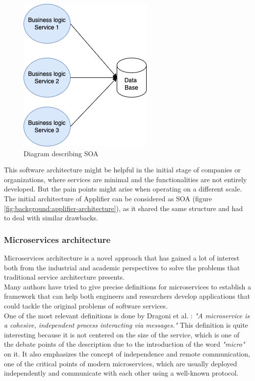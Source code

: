 \documentclass[english, 12pt, a4paper, sci, utf8, a-1b, online]{aaltothesis}
\begin{document}
\begin{figure}[h]
    \centering
    \includegraphics[scale=0.4]{src/thesis/img/literature-review/SOA.png}
    \caption{Diagram describing SOA}
    \label{fig:soa-architecture}
\end{figure}

This software architecture might be helpful in the initial stage of companies or organizations, where services are minimal and the functionalities are not entirely developed. But the pain points might arise when operating on a different scale. The initial architecture of Applifier can be considered as SOA (figure \ref{fig:background:applifier-architecture}), as it shared the same structure and had to deal with similar drawbacks.

\subsubsection{Microservices architecture}
\label{sec:microservices-architecture}

Microservices architecture is a novel approach that has gained a lot of interest both from the industrial and academic perspectives to solve the problems that traditional service architecture presents.\\

Many authors have tried to give precise definitions for microservices to establish a framework that can help both engineers and researchers develop applications that could tackle the original problems of software services.\\

One of the most relevant definitions is done by Dragoni et al. \cite{dragoni2017microservices}: \textit{"A microservice is a cohesive, independent process interacting via messages."} This definition is quite interesting because it is not centered on the size of the service, which is one of the debate points of the description due to the introduction of the word \textit{"micro"} on it. It also emphasizes the concept of independence and remote communication, one of the critical points of modern microservices, which are usually deployed independently and communicate with each other using a well-known protocol.\\
\end{document}
